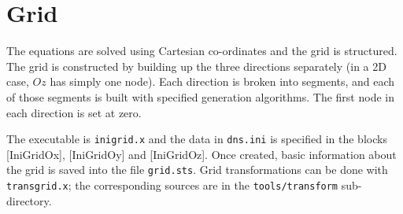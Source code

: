 \chapter{Grid}\label{sec:grid}

The equations are solved using Cartesian co-ordinates and the grid is structured. The grid is constructed by building up the three directions separately (in a 2D case, $Oz$ has simply one node).  Each direction is broken into segments, and each of those segments is built with specified generation algorithms. The first node in each direction is set at zero.

The executable is {\tt inigrid.x} and the data in {\tt dns.ini} is specified in the blocks [IniGridOx], [IniGridOy] and [IniGridOz]. Once created, basic information about the grid is saved into the file {\tt grid.sts}. Grid transformations can be done with {\tt transgrid.x}; the corresponding sources are in the {\tt tools/transform} sub-directory.


